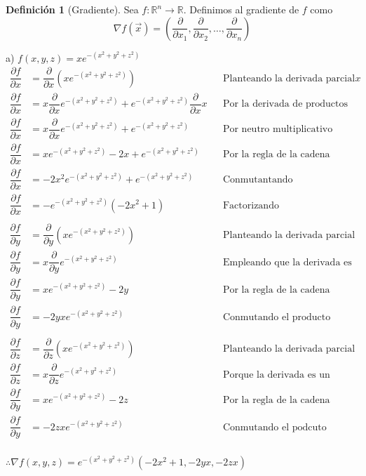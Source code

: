 \documentclass[letterpaper]{article}
\renewcommand{\d}{\partial}
\newcommand{\R}{\mathds{R}}
\renewcommand{\*}{\cdot}
\theoremstyle{definition}
\newtheorem{definition}{Definición}
\begin{document}
\begin{definition}[Gradiente]
	Sea $ f: \R^n \to \R $.
	Definimos al gradiente de $ f $ como 
	\[ \nabla f(\vec{x}) = \left( \dfrac{\d}{\d x_1}, \dfrac{\d}{\d x_2}, \dots, \dfrac{\d}{\d x_n}  \right) \]
\end{definition}
\noindent a) $f(x,y,z) = x e^{-(x^2 +y^2 +z^2)}$
\begin{align*}
	\dfrac{\d f}{\d x} &= \dfrac{\d}{\d x} (x e^{-(x^2 +y^2 +z^2)}) && \text{Planteando la derivada parcial con respecto a } x\\
	\dfrac{\d f}{\d x} &= x\dfrac{\d}{\d x} e^{-(x^2 +y^2 +z^2)} + e^{-(x^2 +y^2 +z^2)} \dfrac{\d}{\d x} x && \text{Por la derivada de productos }\\
	\dfrac{\d f}{\d x} &= x\dfrac{\d}{\d x} e^{-(x^2 +y^2 +z^2)} + e^{-(x^2 +y^2 +z^2)} && \text{Por neutro multiplicativo }\\
	\dfrac{\d f}{\d x} &= xe^{-(x^2 +y^2 +z^2)}-2x + e^{-(x^2 +y^2 +z^2)} && \text{Por la regla de la cadena }\\
	\dfrac{\d f}{\d x} &= -2x^2e^{-(x^2 +y^2 +z^2)} + e^{-(x^2 +y^2 +z^2)} && \text{Conmutantando }\\
	\dfrac{\d f}{\d x} &= -e^{-(x^2 +y^2 +z^2)}(-2x^2 +1) && \text{Factorizando  }\\
	\\
	\dfrac{\d f}{\d y} &= \dfrac{\d}{\d y}(x e^{-(x^2 +y^2 +z^2)}) && \text{Planteando la derivada parcial}\\
	\dfrac{\d f}{\d y} &= x\dfrac{\d}{\d y}e^{-(x^2 +y^2 +z^2)} && \text{Empleando que la derivada es lineal}\\
	\dfrac{\d f}{\d y} &= xe^{-(x^2 +y^2 +z^2)}-2y && \text{Por la regla de la cadena}\\
	\dfrac{\d f}{\d y} &= -2yxe^{-(x^2 +y^2 +z^2)} && \text{Conmutando el producto}\\
	\\
	\dfrac{\d f}{\d z} &= \dfrac{\d}{\d z} (x e^{-(x^2 +y^2 +z^2)}) && \text{Planteando la derivada parcial}\\
	\dfrac{\d f}{\d z} &= x\dfrac{\d}{\d z} e^{-(x^2 +y^2 +z^2)} && \text{Porque la derivada es un operador lineal}\\
	\dfrac{\d f}{\d y} &= xe^{-(x^2 +y^2 +z^2)}-2z && \text{Por la regla de la cadena}\\
	\dfrac{\d f}{\d y} &= -2zxe^{-(x^2 +y^2 +z^2)} && \text{Conmutando el podcuto}\\
\end{align*}
\begin{center}
	$ \therefore \nabla f(x,y,z) = e^{-(x^2 +y^2 +z^2)} ( -2x^2 +1, -2yx, -2zx ) $
\end{center}
\end{document}
